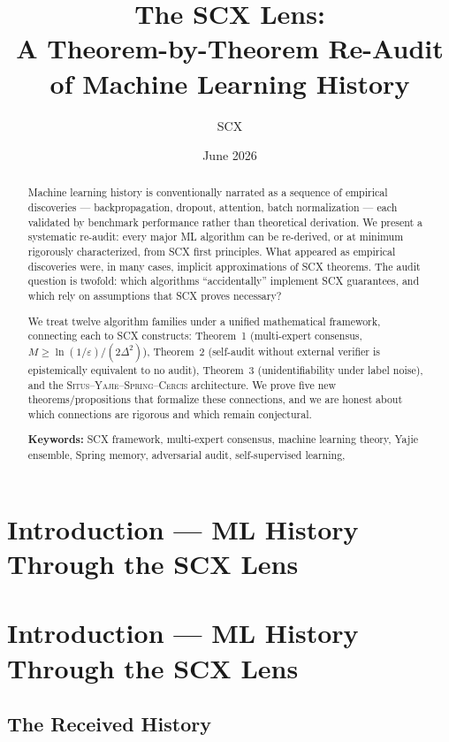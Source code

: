 \documentclass[12pt,a4paper]{article}
\title{\textbf{The SCX Lens:}\\[4pt]
       \large A Theorem-by-Theorem Re-Audit of Machine Learning History}
\author{SCX}
\date{June 2026}
\theoremstyle{definition}
\newcommand{\Situs}{\textsc{Situs}}
\newcommand{\Yajie}{\textsc{Yajie}}
\newcommand{\Spring}{\textsc{Spring}}
\newcommand{\Cercis}{\textsc{Cercis}}
\newcommand{\SCX}{\textsc{SCX}}
\begin{document}
\maketitle

\begin{abstract}
Machine learning history is conventionally narrated as a sequence of empirical discoveries — backpropagation, dropout, attention, batch normalization — each validated by benchmark performance rather than theoretical derivation. We present a systematic re-audit: every major ML algorithm can be re-derived, or at minimum rigorously characterized, from \SCX{} first principles. What appeared as empirical discoveries were, in many cases, implicit approximations of \SCX{} theorems. The audit question is twofold: which algorithms ``accidentally'' implement \SCX{} guarantees, and which rely on assumptions that \SCX{} proves necessary?

We treat twelve algorithm families under a unified mathematical framework, connecting each to \SCX{} constructs: Theorem~1 (multi-expert consensus, $M \ge \ln(1/\varepsilon)/(2\Delta^2)$), Theorem~2 (self-audit without external verifier is epistemically equivalent to no audit), Theorem~3 (unidentifiability under label noise), and the \Situs{}--\Yajie{}--\Spring{}--\Cercis{} architecture. We prove five new theorems/propositions that formalize these connections, and we are honest about which connections are rigorous and which remain conjectural.

\medskip
\noindent\textbf{Keywords:} SCX framework, multi-expert consensus, machine learning theory, Yajie ensemble, Spring memory, adversarial audit, self-supervised learning, 
\end{abstract}

\section{Introduction — ML History Through the SCX Lens}
\section{Introduction --- ML History Through the SCX Lens}
\label{sec:intro}

\subsection{The Received History}
\end{document}
